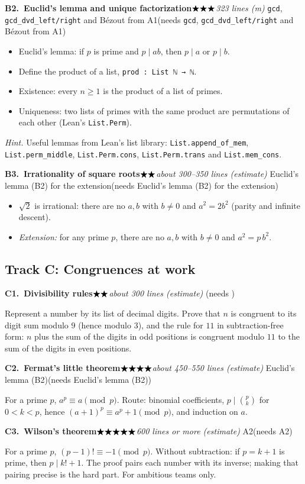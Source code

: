 \documentclass[11pt]{article}
\newcommand{\lean}[1]{\texttt{#1}}
\newcommand{\dvd}{\ensuremath{\mid}}
\newcommand{\stars}[1]{\ensuremath{%
  \ifcase#1\or\bigstar\or\bigstar\bigstar\or\bigstar\bigstar\bigstar\or
  \bigstar\bigstar\bigstar\bigstar\or\bigstar\bigstar\bigstar\bigstar\bigstar\fi}}
\newcommand{\topic}[5]{%
  \par\medskip\noindent\textbf{#1.\ #2}\hfill\quad\stars{#3}\enspace\textit{#4}%
  \ifx\relax#5\relax\else\enspace(needs #5)\fi\par\nopagebreak}
\begin{document}
\topic{B2}{Euclid's lemma and unique factorization}{3}{323 lines (m)}{%
\lean{gcd}, \lean{gcd\_dvd\_left/right} and B\'ezout from A1}
\begin{itemize}
\item Euclid's lemma: if $p$ is prime and $p \dvd ab$, then $p \dvd a$ or $p \dvd b$.
\item Define the product of a list, \lean{prod : List ℕ → ℕ}.
\item Existence: every $n \ge 1$ is the product of a list of primes.
\item Uniqueness: two lists of primes with the same product are permutations of each other
  (Lean's \lean{List.Perm}).
\end{itemize}
\emph{Hint.} Useful lemmas from Lean's list library:
\lean{List.append\_of\_mem}, \lean{List.perm\_middle}, \lean{List.Perm.cons},
\lean{List.Perm.trans} and \lean{List.mem\_cons}.

\topic{B3}{Irrationality of square roots}{2}{about 300--350 lines (estimate)}{%
Euclid's lemma (B2) for the extension}
\begin{itemize}
\item $\sqrt 2$ is irrational: there are no $a, b$ with $b \ne 0$ and $a^2 = 2 b^2$ (parity and
  infinite descent).
\item \emph{Extension:} for any prime $p$, there are no $a, b$ with $b \ne 0$ and $a^2 = p\, b^2$.
\end{itemize}

\subsection*{Track C: Congruences at work}

\topic{C1}{Divisibility rules}{2}{about 300 lines (estimate)}{}
Represent a number by its list of decimal digits. Prove that $n$ is congruent to its digit sum
modulo $9$ (hence modulo $3$), and the rule for $11$ in subtraction-free form: $n$ plus the sum
of the digits in odd positions is congruent modulo $11$ to the sum of the digits in even
positions.

\topic{C2}{Fermat's little theorem}{4}{about 450--550 lines (estimate)}{Euclid's lemma (B2)}
For a prime $p$, $a^p \equiv a \pmod p$. Route: binomial coefficients, $p \dvd \binom pk$ for
$0 < k < p$, hence $(a+1)^p \equiv a^p + 1 \pmod p$, and induction on $a$.

\topic{C3}{Wilson's theorem}{5}{600 lines or more (estimate)}{A2}
For a prime $p$, $(p-1)! \equiv -1 \pmod p$. Without subtraction: if $p = k + 1$ is prime, then
$p \dvd k! + 1$. The proof pairs each number with its inverse; making that pairing precise is the
hard part. For ambitious teams only.
\end{document}
